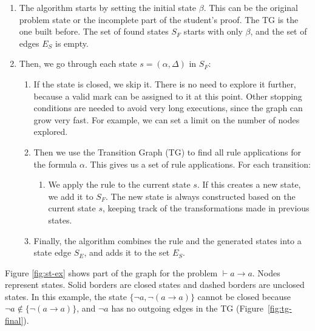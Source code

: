 \documentclass[runningheads]{llncs}
\begin{document}
\begin{enumerate}
    \item The algorithm starts by setting the initial state \(\beta\). This can be the original problem state or the incomplete part of the student's proof. The TG is the one built before. The set of found states \(S_F\) starts with only \(\beta\), and the set of edges \(E_S\) is empty.

    \item Then, we go through each state \(s = (\alpha, \Delta)\) in \(S_F\):

    \begin{enumerate}
        \item If the state is closed, we skip it. There is no need to explore it further, because a valid mark can be assigned to it at this point. Other stopping conditions are needed to avoid very long executions, since the graph can grow very fast. For example, we can set a limit on the number of nodes explored.

        \item Then we use the Transition Graph (TG) to find all rule applications for the formula \(\alpha\). This gives us a set of rule applications. For each transition:

        \begin{enumerate}
            \item We apply the rule to the current state \(s\). If this creates a new state, we add it to \(S_F\). The new state is always constructed based on the current state \(s\), keeping track of the transformations made in previous states.
        \end{enumerate}

        \item Finally, the algorithm combines the rule and the generated states into a state edge \(S_E\), and adds it to the set \(E_S\).
    \end{enumerate}
\end{enumerate}


Figure \ref{fig:st-ex} shows part of the graph for the problem \(\vdash a \to a\). Nodes represent states. Solid borders are closed states and dashed borders are unclosed states. In this example, the state $\{\lnot a, \lnot(a \to a)\}$ cannot be closed because $\lnot a \notin \{\lnot(a \to a)\}$, and $\lnot a$ has no outgoing edges in the TG (Figure~\ref{fig:tg-final}).
\end{document}
